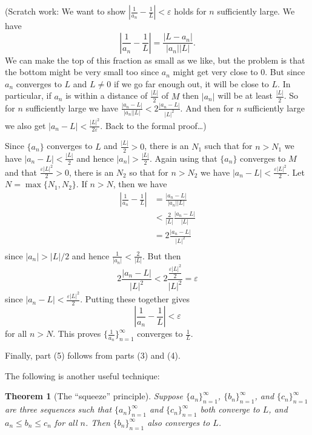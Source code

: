 \documentclass[12pt]{amsart}
\def\e{\varepsilon}
\numberwithin{equation}{section}
\theoremstyle{plain} %
\newtheorem{thm}[equation]{Theorem}
\theoremstyle{definition}
\theoremstyle{remark}
\begin{document}
\begin{framed}
	(Scratch work: We want to show $\left|\frac{1}{a_n} -
	\frac{1}{L}\right| < \e$ holds for $n$ sufficiently large.  
	We have
	$$
	\left|\frac{1}{a_n} - \frac{1}{L}\right| = \frac{|L - a_n|}{|a_n||L|}.
	$$ 
	We can make the top of this fraction as small as we like, but the problem is that the
	bottom might be very small too since $a_n$ might get very close to $0$. But since $a_n$ converges to $L$ and $L \ne 0$ if we go far enough out, it will be
	close to $L$. In particular, if $a_n$ is within a distance of
	$\frac{|L|}{2}$ of $M$ then $|a_n|$ will be at least
	$\frac{|L|}{2}$. So for $n$ sufficiently large we have
	$\frac{|a_n-L|}{|a_n||L|} < 2 \frac{|a_n-L|}{|L|^2}$. And then for $n$
	sufficiently large we also get $|a_n - L| < \frac{|L|^2}{2 \e}$.  Back to the formal proof\dots)
	
	
	
	Since $\{a_n\}$ converges to $L$ and $\frac{|L|}{2} > 0$, there is an $N_1$ such that for $n > N_1$ we have $|a_n - L| < \frac{|L|}{2}$  and hence
	$|a_n| > \frac{|L|}{2}$. Again using that $\{a_n\}$ converges to $M$
	and that $\frac{ \e |L|^2}{2} > 0$, there is an $N_2$ so that for $n > N_2$ we have
	$|a_n - L| < \frac{ \e |L|^2}{2}$. Let $N = \max\{N_1, N_2\}$. If $n > N$, then we have
	$$
	\begin{aligned}
	\left|\frac{1}{a_n} - \frac{1}{L}\right| & = \frac{|a_n - L|}{|a_n||L|} \\
	& < \frac{2}{|L|}  \frac{|a_n - L|}{|L|} \\
	& = 2 \frac{|a_n - L|}{|L|^2} \\
	\end{aligned}
	$$
	since $|a_n| > |L|/2$ and hence $\frac{1}{|a_n|} < \frac{2}{|L|}$.
	But then
	$$
	2 \frac{|a_n - L|}{|L|^2}  < 2 \frac{\frac{\e |L|^2}{2}}{|L|^2} = \e
	$$
	since $|a_n - L| < \frac{ \e |L|^2}{2}$. Putting these together gives
	$$
	\left|\frac{1}{a_n} - \frac{1}{L}\right| < \e
	$$
	for all $n > N$. 
	This proves $\{\frac{1}{a_n}\}_{n=1}^\infty$ converges to $\frac{1}{L}$.

Finally, part (5) follows from parts (3) and (4).

	\end{framed}




The following is another useful technique:

\begin{thm}[The ``squeeze'' principle]
Suppose 
$\{a_n\}_{n=1}^\infty$, $\{b_n\}_{n=1}^\infty$, and $\{c_n\}_{n=1}^\infty$ are three sequences such that 
$\{a_n\}_{n=1}^\infty$ and $\{c_n\}_{n=1}^\infty$ both converge to $L$, 
 and $a_n \leq b_n \leq c_n$ for all $n$.
Then $\{b_n\}_{n=1}^\infty$ also converges to $L$.
\end{thm}
\end{document}
